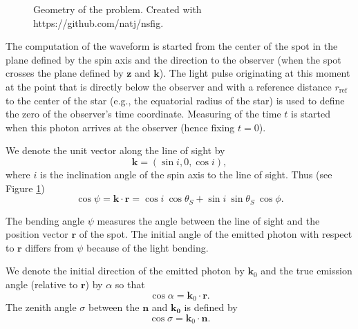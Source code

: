 \documentclass{wihuri}
\def\be{\begin{equation}}
\def\ee{\end{equation}}
\def\thetas{\theta_{S}}
\newcommand{\bmath}[1]{\boldsymbol{#1}}
\begin{document}
\begin{figure}
\centerline{}
\caption{Geometry of the problem. Created with https://github.com/natj/nsfig. %
\label{fig:geom2}}
\end{figure}



The computation of the waveform is started from the center of the spot in the plane defined by the spin axis and the direction to the observer 
(when the spot crosses the plane defined by $\bmath{z}$ and $\bmath{k}$). The light pulse originating at this moment at the point that is directly below the observer and with a reference distance $r_{\mathrm{ref}}$ to the center of the star (e.g., the equatorial radius of the star) is used to define the zero of the observer's time coordinate. Measuring of the time $t$ is started when this photon arrives at the observer (hence fixing $t=0$). %



We denote the unit vector along the line of sight by 
\be
\bmath{k}=(\sin i, 0, \cos i), 
\ee 
where $i$ is the inclination angle of the spin axis to the line of sight. 
Thus (see Figure \ref{fig:geom2})
\be \label{eq:psi2}
  \cos\psi=\bmath{k}\cdot \bmath{r} = \cos i\ \cos\thetas+\sin i\ \sin \thetas\ \cos\phi.
\ee

The bending angle $\psi$ measures the angle between the line of sight and the position vector $\bmath{r}$ of the spot. The initial angle of the emitted photon with respect to
 ${\bmath{r}}$ differs from $\psi$ because of the light bending.



We denote the initial direction of the emitted photon by $\bmath{k}_0$ %
and the true emission angle (relative to $\bmath{r}$) by $\alpha$ so that
\be
 \cos\alpha=\bmath{k}_0 \cdot \bmath{r}.
\ee
The zenith angle $\sigma$ between the $\bmath{n}$ and $\bmath{k_{0}}$ is defined by 
\be
\cos\sigma = \bmath{k}_{0}\cdot\bmath{n}.
\ee
\end{document}
